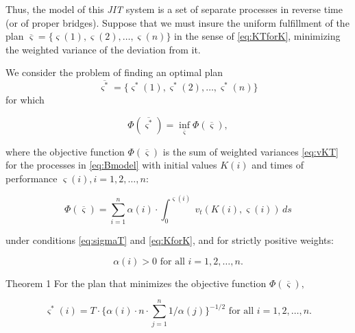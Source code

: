 Thus, the model of this \emph{JIT} system is a set of separate processes in reverse time (or of proper bridges). Suppose that we must insure the uniform fulfillment of the plan $\overline{\varsigma} =\{\varsigma(1), \varsigma(2), \dotsc , \varsigma(n)\}$ in the sense of \eqref{eq:KTforK}, minimizing the weighted variance of the deviation from it.

	

	We consider the problem of finding an optimal plan $$\overline{\varsigma^*}=\{\varsigma^*(1), \varsigma^*(2), \dotsc ,  \varsigma^*(n)\}$$ for which 


\begin{equation}\label{eq:PhiSigma}

 \Phi (\overline{{\varsigma}^*}) = 

 \inf_{\overline{\varsigma}}\Phi (\overline{\varsigma}),

\end{equation}

where the objective function $\Phi (\overline{\varsigma})$ is the sum of weighted variances \eqref{eq:vKT} for the processes in \eqref{eq:Bmodel} with initial values $K(i)$ and times of performance $\varsigma(i), i=1, 2, \dotsc , n$:

\begin{equation}\label{eq:Phi(sigma)}

\Phi (\overline{\varsigma}) =  \sum_{i=1}^{n} \alpha(i) \cdot \int_{0}^{\varsigma(i)}\!\ {v_t}(K(i), \varsigma(i))\,ds

\end{equation}

under conditions \eqref{eq:sigmaT} and \eqref{eq:KforK}, and for strictly positive weights:

\begin{equation}\label{eq:alpha(i)}

\alpha(i) > 0 \text{ for all $i=1, 2, \dotsc , n$}.

\end{equation}



\smallskip








\hypertarget{b:Th1}{}



\begin{newthm}{Theorem 1} For the plan that minimizes the objective function $\Phi (\overline{\varsigma}),$

\begin{equation}

\label{eq:Theorem1}

{\varsigma}^*(i) = T\cdot \biggl\{\alpha(i) \cdot n \cdot \sum_{j=1}^{n} 1/\alpha(j) \biggr\}^{-1 / 2} \text{ for all $i=1, 2, \dotsc , n$}.

\end{equation}

\end{newthm}





